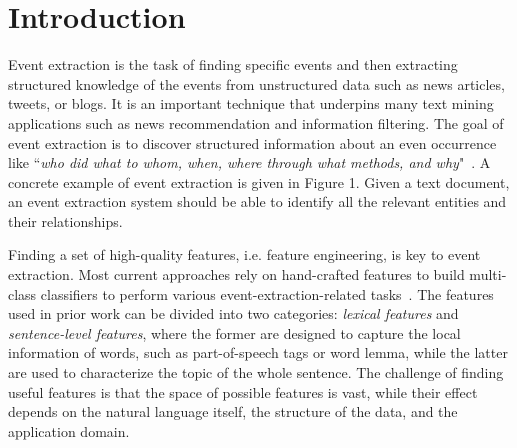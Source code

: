 \section{Introduction}

Event extraction is the task of finding specific events and then extracting structured knowledge of the events from
unstructured data such as news articles, tweets, or blogs. It is an important technique that underpins many text mining
applications such as news recommendation and information filtering. 
The goal of event extraction is to discover structured information about an even occurrence like ``\emph{who did what to whom,
when, where through what methods, and why}"~\cite{Piskorski2013}. A concrete example of event extraction is
given in Figure 1. Given a text
document, an event extraction system should be able to identify all the relevant entities and their relationships.

Finding a set of high-quality features, i.e. feature engineering, is key to event extraction. 
Most current approaches rely on hand-crafted features to build multi-class classifiers to perform various 
event-extraction-related tasks~\cite{ahn2006stages,chen2009language,li2012employing,chen2012joint}. The
features used in prior work can be divided into two categories: \emph{lexical features} and \emph{sentence-level features}, where the
former are designed to capture the local information of words, such as part-of-speech tags or word lemma, while the latter are used to 
characterize the topic of the whole sentence. The challenge of finding useful
features is that the space of possible features is vast, while their effect depends on  the natural language
itself, the structure of the data, and the application domain. 

